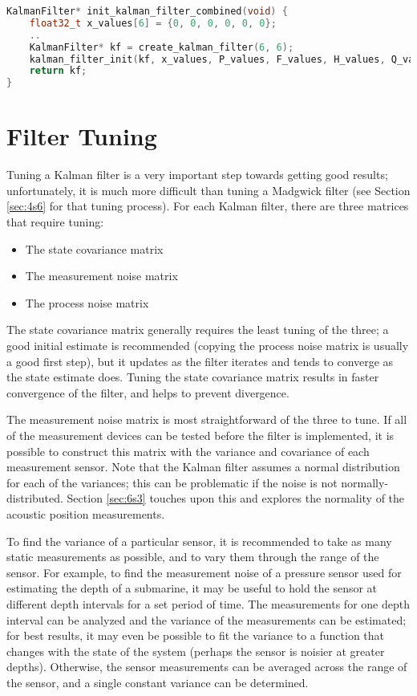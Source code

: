 \documentclass[12pt,a4paper]{report}
\begin{document}
\begin{lstlisting}[language=C++]
KalmanFilter* init_kalman_filter_combined(void) {
	float32_t x_values[6] = {0, 0, 0, 0, 0, 0};
	..
	KalmanFilter* kf = create_kalman_filter(6, 6);
	kalman_filter_init(kf, x_values, P_values, F_values, H_values, Q_values, R_values);
	return kf;
}
\end{lstlisting}

\section{Filter Tuning} \label{sec:5s5}
Tuning a Kalman filter is a very important step towards getting good results; unfortunately, it is much more difficult than tuning a Madgwick filter (see Section \ref{sec:4s6} for that tuning process). For each Kalman filter, there are three matrices that require tuning:
\begin{itemize}[noitemsep,topsep=0pt,]
	\item The state covariance matrix
	\item The measurement noise matrix
	\item The process noise matrix
\end{itemize}

The state covariance matrix generally requires the least tuning of the three; a good initial estimate is recommended (copying the process noise matrix is usually a good first step), but it updates as the filter iterates and tends to converge as the state estimate does. Tuning the state covariance matrix results in faster convergence of the filter, and helps to prevent divergence.

\pagebreak

The measurement noise matrix is most straightforward of the three to tune. If all of the measurement devices can be tested before the filter is implemented, it is possible to construct this matrix with the variance and covariance of each measurement sensor. Note that the Kalman filter assumes a normal distribution for each of the variances; this can be problematic if the noise is not normally-distributed. Section \ref{sec:6s3} touches upon this and explores the normality of the acoustic position measurements. 

To find the variance of a particular sensor, it is recommended to take as many static measurements as possible, and to vary them through the range of the sensor. For example, to find the measurement noise of a pressure sensor used for estimating the depth of a submarine, it may be useful to hold the sensor at different depth intervals for a set period of time. The measurements for one depth interval can be analyzed and the variance of the measurements can be estimated; for best results, it may even be possible to fit the variance to a function that changes with the state of the system (perhaps the sensor is noisier at greater depths). Otherwise, the sensor measurements can be averaged across the range of the sensor, and a single constant variance can be determined.
\end{document}
